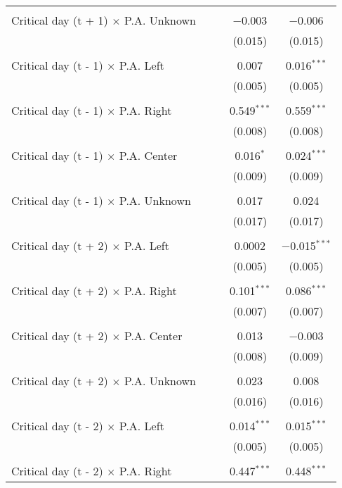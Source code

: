\documentclass[
]{article}
\begin{document}
\begin{table}[!htbp]
{\begin{tabular}{@{\extracolsep{5pt}}lcccc}
  & & & & \\ 
 Critical day (t + 1) $\times$ P.A. Unknown &  &  & $-$0.003 & $-$0.006 \\ 
  &  &  & (0.015) & (0.015) \\ 
  & & & & \\ 
 Critical day (t - 1) $\times$ P.A. Left &  &  & 0.007 & 0.016$^{***}$ \\ 
  &  &  & (0.005) & (0.005) \\ 
  & & & & \\ 
 Critical day (t - 1) $\times$ P.A. Right &  &  & 0.549$^{***}$ & 0.559$^{***}$ \\ 
  &  &  & (0.008) & (0.008) \\ 
  & & & & \\ 
 Critical day (t - 1) $\times$ P.A. Center &  &  & 0.016$^{*}$ & 0.024$^{***}$ \\ 
  &  &  & (0.009) & (0.009) \\ 
  & & & & \\ 
 Critical day (t - 1) $\times$ P.A. Unknown &  &  & 0.017 & 0.024 \\ 
  &  &  & (0.017) & (0.017) \\ 
  & & & & \\ 
 Critical day (t + 2) $\times$ P.A. Left &  &  & 0.0002 & $-$0.015$^{***}$ \\ 
  &  &  & (0.005) & (0.005) \\ 
  & & & & \\ 
 Critical day (t + 2) $\times$ P.A. Right &  &  & 0.101$^{***}$ & 0.086$^{***}$ \\ 
  &  &  & (0.007) & (0.007) \\ 
  & & & & \\ 
 Critical day (t + 2) $\times$ P.A. Center &  &  & 0.013 & $-$0.003 \\ 
  &  &  & (0.008) & (0.009) \\ 
  & & & & \\ 
 Critical day (t + 2) $\times$ P.A. Unknown &  &  & 0.023 & 0.008 \\ 
  &  &  & (0.016) & (0.016) \\ 
  & & & & \\ 
 Critical day (t - 2) $\times$ P.A. Left &  &  & 0.014$^{***}$ & 0.015$^{***}$ \\ 
  &  &  & (0.005) & (0.005) \\ 
  & & & & \\ 
 Critical day (t - 2) $\times$ P.A. Right &  &  & 0.447$^{***}$ & 0.448$^{***}$ \\ 

\end{tabular}}
\end{table}
\end{document}
